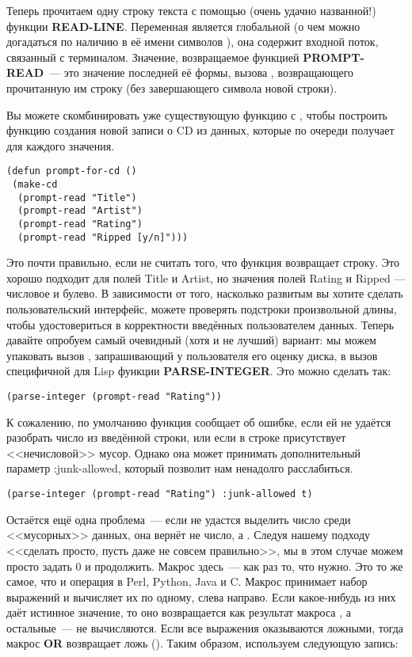 Теперь прочитаем одну строку текста с помощью (очень удачно названной!) функции
\textbf{READ-LINE}. Переменная  является глобальной (о чем можно
догадаться по наличию в её имени символов \code{*}), она содержит входной поток, связанный
с терминалом. Значение, возвращаемое функцией \textbf{PROMPT-READ}~--- это значение
последней её формы, вызова , возвращающего прочитанную им строку (без
завершающего символа новой строки).

Вы можете скомбинировать уже существующую функцию  с ,
чтобы построить функцию создания новой записи о CD из данных, которые  по
очереди получает для каждого значения.

\begin{lstlisting}
(defun prompt-for-cd ()
 (make-cd
  (prompt-read "Title")
  (prompt-read "Artist")
  (prompt-read "Rating")
  (prompt-read "Ripped [y/n]")))
\end{lstlisting}

Это почти правильно, если не считать того, что функция  возвращает
строку. Это хорошо подходит для полей Title и Artist, но значения полей Rating и Ripped
--- числовое и булево. В зависимости от того, насколько развитым вы хотите сделать
пользовательский интерфейс, можете проверять подстроки произвольной длины, чтобы
удостовериться в корректности введённых пользователем данных. Теперь давайте опробуем
самый очевидный (хотя и не лучший) вариант: мы можем упаковать вызов ,
запрашивающий у пользователя его оценку диска, в вызов специфичной для Lisp функции
\textbf{PARSE-INTEGER}. Это можно сделать так:

\begin{lstlisting}
(parse-integer (prompt-read "Rating"))
\end{lstlisting}

К сожалению, по умолчанию функция  сообщает об ошибке, если ей не
удаётся разобрать число из введённой строки, или если в строке присутствует <<нечисловой>>
мусор. Однако она может принимать дополнительный параметр :junk-allowed, который позволит
нам ненадолго расслабиться.

\begin{lstlisting}
(parse-integer (prompt-read "Rating") :junk-allowed t)
\end{lstlisting}

Остаётся ещё одна проблема~--- если  не удастся выделить число среди
<<мусорных>> данных, она вернёт не число, а . Следуя нашему подходу <<сделать
просто, пусть даже не совсем правильно>>, мы в этом случае можем просто задать 0 и
продолжить. Макрос  здесь~--- как раз то, что нужно. Это то же самое, что и
операция \code{||} в Perl, Python, Java и C. Макрос принимает набор выражений и
вычисляет их по одному, слева направо. Если какое-нибудь из них даёт истинное значение, то
оно возвращается как результат макроса , а остальные~--- не вычисляются. Если
все выражения оказываются ложными, тогда макрос \textbf{OR} возвращает ложь
(). Таким образом, используем следующую запись:

